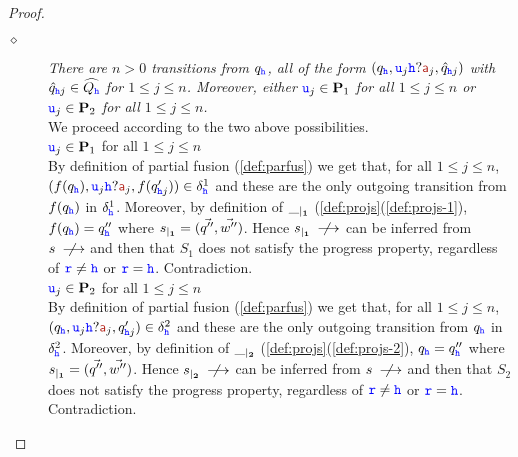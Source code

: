 \begin{proof}
\begin{description}
\begin{description}
%
\item[\underline{$\diamond$}] \emph{There are $n>0$ transitions from $q_{\mathtt{\color{blue}{ {h}}}}$, all of the form
$(q_{\HH},\ttu_j\HH?\msg[a]_j,\hat q_{\hh j})$ with $\hat q_{{\mathtt{\color{blue}{ {h}}}} j} \in\widehat{Q_{\mathtt{\color{blue}{ {h}}}}}$
for $1\leq j\leq n$. Moreover, either
${\mathtt{\color{blue}{ {u}}}}_j\in\mathbf{P}_1$ for all $1\leq j\leq n$ or ${\mathtt{\color{blue}{ {u}}}}_j\in\mathbf{P}_2$ for all $1\leq j\leq n$.}\\[1mm]
We proceed according to the two above possibilities.\\[1mm]
${\mathtt{\color{blue}{ {u}}}}_j\in\mathbf{P}_1$ for all $1\leq j\leq n$\\
By definition of partial fusion (\cref{def:parfus}) we get that, for all $1\leq j\leq n$,
$(f(q_{\HH}),\ttu_j{\HH}?\msg[a]_j,f(q'_{\hh j}))\in\delta^1_\hh$ and these are the only
outgoing transition from $f(q_{{\mathtt{\color{blue}{ {h}}}}})$ in $\delta^1_{\mathtt{\color{blue}{ {h}}}}$. 
Moreover, by definition of ${\_}_{\mid_{\mathbf{1}}}$ (\cref{def:projs}(\ref{def:projs-1}), 
$f(q_{\mathtt{\color{blue}{ {h}}}})=q''_{\mathtt{\color{blue}{ {h}}}}$ where ${s}_{\mid_{\mathbf{1}}}=(\vec{q''},\vec{w''})$.
Hence ${s}_{\mid_{\mathbf{1}}}\stackrel{}{\;\;\not\!\!\longrightarrow}$ can be inferred from $s\stackrel{}{\;\;\not\!\!\longrightarrow}$ and then 
that $S_1$ does not satisfy the progress property, regardless of ${\mathtt{\color{blue}{ {r}}}}\neq{ \ensuremath{\mathtt{\color{blue}{ {h}}}} }$ or ${\mathtt{\color{blue}{ {r}}}}={\mathtt{\color{blue}{ {h}}}}$. Contradiction.\\[1mm]
%
${\mathtt{\color{blue}{ {u}}}}_j\in\mathbf{P}_2$ for all $1\leq j\leq n$\\
By definition of partial fusion (\cref{def:parfus}) we get that, for all $1\leq j\leq n$,
$(q_{\HH},\ttu_j{\HH}?\msg[a]_j,q'_{\hh j})\in\delta^2_\hh$ and these are the only
outgoing transition from $q_{{\mathtt{\color{blue}{ {h}}}}}$ in $\delta^2_{\mathtt{\color{blue}{ {h}}}}$. 
Moreover, by definition of ${\_}_{\mid_{\mathbf{2}}}$ (\cref{def:projs}(\ref{def:projs-2}), 
$q_{\mathtt{\color{blue}{ {h}}}}=q''_{\mathtt{\color{blue}{ {h}}}}$ where ${s}_{\mid_{\mathbf{1}}}=(\vec{q''},\vec{w''})$.
Hence ${s}_{\mid_{\mathbf{2}}}\stackrel{}{\;\;\not\!\!\longrightarrow}$ can be inferred from $s\stackrel{}{\;\;\not\!\!\longrightarrow}$ and then 
that $S_2$ does not satisfy the progress property, regardless of ${\mathtt{\color{blue}{ {r}}}}\neq{ \ensuremath{\mathtt{\color{blue}{ {h}}}} }$ or ${\mathtt{\color{blue}{ {r}}}}={\mathtt{\color{blue}{ {h}}}}$. Contradiction.
\end{description}
\end{description}
\end{proof}









